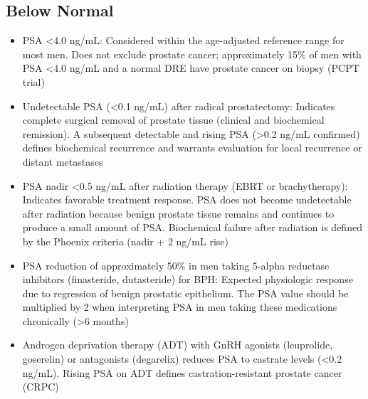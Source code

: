 \subsection*{Below Normal}
\begin{itemize}
  \item PSA <4.0 ng/mL: Considered within the age-adjusted reference range for most men. Does not exclude prostate cancer; approximately 15\% of men with PSA <4.0 ng/mL and a normal DRE have prostate cancer on biopsy (PCPT trial)
  \item Undetectable PSA (<0.1 ng/mL) after radical prostatectomy: Indicates complete surgical removal of prostate tissue (clinical and biochemical remission). A subsequent detectable and rising PSA (>0.2 ng/mL confirmed) defines biochemical recurrence and warrants evaluation for local recurrence or distant metastases
  \item PSA nadir <0.5 ng/mL after radiation therapy (EBRT or brachytherapy): Indicates favorable treatment response. PSA does not become undetectable after radiation because benign prostate tissue remains and continues to produce a small amount of PSA. Biochemical failure after radiation is defined by the Phoenix criteria (nadir + 2 ng/mL rise)
  \item PSA reduction of approximately 50\% in men taking 5-alpha reductase inhibitors (finasteride, dutasteride) for BPH: Expected physiologic response due to regression of benign prostatic epithelium. The PSA value should be multiplied by 2 when interpreting PSA in men taking these medications chronically (>6 months)
  \item Androgen deprivation therapy (ADT) with GnRH agonists (leuprolide, goserelin) or antagonists (degarelix) reduces PSA to castrate levels (<0.2 ng/mL). Rising PSA on ADT defines castration-resistant prostate cancer (CRPC)
\end{itemize}


